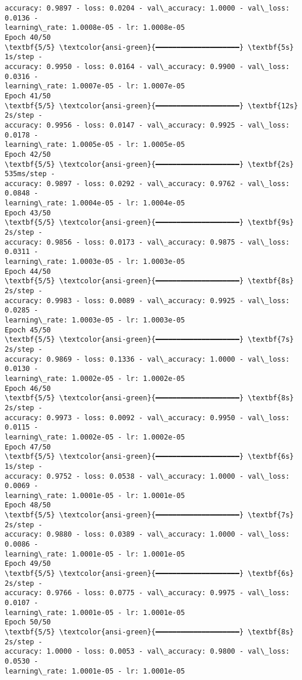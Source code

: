 \documentclass[11pt]{article}
\begin{document}
\begin{Verbatim}[commandchars=\\\{\}]
accuracy: 0.9897 - loss: 0.0204 - val\_accuracy: 1.0000 - val\_loss: 0.0136 -
learning\_rate: 1.0008e-05 - lr: 1.0008e-05
Epoch 40/50
\textbf{5/5} \textcolor{ansi-green}{━━━━━━━━━━━━━━━━━━━━} \textbf{5s} 1s/step -
accuracy: 0.9950 - loss: 0.0164 - val\_accuracy: 0.9900 - val\_loss: 0.0316 -
learning\_rate: 1.0007e-05 - lr: 1.0007e-05
Epoch 41/50
\textbf{5/5} \textcolor{ansi-green}{━━━━━━━━━━━━━━━━━━━━} \textbf{12s} 2s/step -
accuracy: 0.9956 - loss: 0.0147 - val\_accuracy: 0.9925 - val\_loss: 0.0178 -
learning\_rate: 1.0005e-05 - lr: 1.0005e-05
Epoch 42/50
\textbf{5/5} \textcolor{ansi-green}{━━━━━━━━━━━━━━━━━━━━} \textbf{2s} 535ms/step -
accuracy: 0.9897 - loss: 0.0292 - val\_accuracy: 0.9762 - val\_loss: 0.0848 -
learning\_rate: 1.0004e-05 - lr: 1.0004e-05
Epoch 43/50
\textbf{5/5} \textcolor{ansi-green}{━━━━━━━━━━━━━━━━━━━━} \textbf{9s} 2s/step -
accuracy: 0.9856 - loss: 0.0173 - val\_accuracy: 0.9875 - val\_loss: 0.0311 -
learning\_rate: 1.0003e-05 - lr: 1.0003e-05
Epoch 44/50
\textbf{5/5} \textcolor{ansi-green}{━━━━━━━━━━━━━━━━━━━━} \textbf{8s} 2s/step -
accuracy: 0.9983 - loss: 0.0089 - val\_accuracy: 0.9925 - val\_loss: 0.0285 -
learning\_rate: 1.0003e-05 - lr: 1.0003e-05
Epoch 45/50
\textbf{5/5} \textcolor{ansi-green}{━━━━━━━━━━━━━━━━━━━━} \textbf{7s} 2s/step -
accuracy: 0.9869 - loss: 0.1336 - val\_accuracy: 1.0000 - val\_loss: 0.0130 -
learning\_rate: 1.0002e-05 - lr: 1.0002e-05
Epoch 46/50
\textbf{5/5} \textcolor{ansi-green}{━━━━━━━━━━━━━━━━━━━━} \textbf{8s} 2s/step -
accuracy: 0.9973 - loss: 0.0092 - val\_accuracy: 0.9950 - val\_loss: 0.0115 -
learning\_rate: 1.0002e-05 - lr: 1.0002e-05
Epoch 47/50
\textbf{5/5} \textcolor{ansi-green}{━━━━━━━━━━━━━━━━━━━━} \textbf{6s} 1s/step -
accuracy: 0.9752 - loss: 0.0538 - val\_accuracy: 1.0000 - val\_loss: 0.0069 -
learning\_rate: 1.0001e-05 - lr: 1.0001e-05
Epoch 48/50
\textbf{5/5} \textcolor{ansi-green}{━━━━━━━━━━━━━━━━━━━━} \textbf{7s} 2s/step -
accuracy: 0.9880 - loss: 0.0389 - val\_accuracy: 1.0000 - val\_loss: 0.0086 -
learning\_rate: 1.0001e-05 - lr: 1.0001e-05
Epoch 49/50
\textbf{5/5} \textcolor{ansi-green}{━━━━━━━━━━━━━━━━━━━━} \textbf{6s} 2s/step -
accuracy: 0.9766 - loss: 0.0775 - val\_accuracy: 0.9975 - val\_loss: 0.0107 -
learning\_rate: 1.0001e-05 - lr: 1.0001e-05
Epoch 50/50
\textbf{5/5} \textcolor{ansi-green}{━━━━━━━━━━━━━━━━━━━━} \textbf{8s} 2s/step -
accuracy: 1.0000 - loss: 0.0053 - val\_accuracy: 0.9800 - val\_loss: 0.0530 -
learning\_rate: 1.0001e-05 - lr: 1.0001e-05
    \end{Verbatim}

    \begin{center}
    \end{center}
    { \hspace*{\fill} \\}
    
\end{document}

